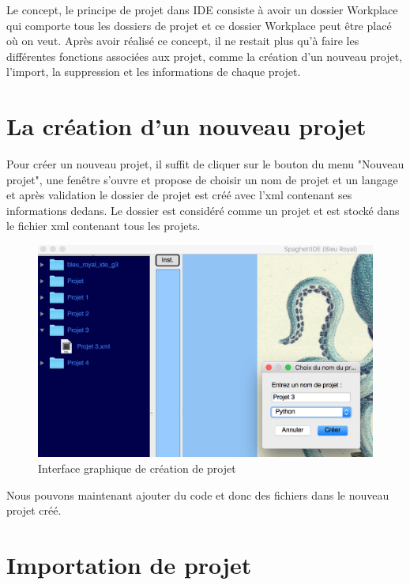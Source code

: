 \documentclass[a4paper,12pt]{article}
\begin{document}
Le concept, le principe de projet dans IDE consiste à avoir un dossier Workplace qui comporte tous les dossiers de projet et ce dossier Workplace peut être placé où on veut. Après avoir réalisé ce concept, il ne restait plus qu'à faire les différentes fonctions associées aux projet, comme la création d'un nouveau projet, l'import, la suppression et les informations de chaque projet.
	
\section{La création d'un nouveau projet}
		
Pour créer un nouveau projet, il suffit de cliquer sur le bouton du menu "Nouveau projet", une fenêtre s'ouvre et propose de choisir un nom de projet et un langage et après validation le dossier de projet est créé avec l'xml contenant ses informations dedans. Le dossier est considéré comme un projet et est stocké dans le fichier xml contenant tous les projets.

\begin{figure}[h!]
			\begin{center}
				\includegraphics[scale=0.6]{images/creation_project.png}
				\caption{Interface graphique de création de projet}
			\end{center}
		\end{figure}

Nous pouvons maintenant ajouter du code et donc des fichiers dans le nouveau projet créé.

\section{Importation de projet}
\end{document}
